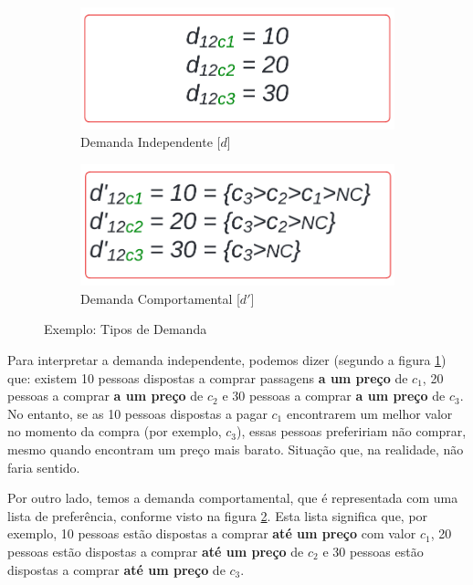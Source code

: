 \begin{figure}[h!]
	\centering
	\begin{subfigure}[b]{0.40\linewidth}
		\includegraphics[width=\linewidth]{img/dem_indepen.png}
		\caption{Demanda Independente [$d$]}
		\label{fig:dem_indepen}
	\end{subfigure}\hspace{5mm}
	\begin{subfigure}[b]{0.40\linewidth}
		\includegraphics[width=\linewidth]{img/dem_compo.png}
		\caption{Demanda Comportamental [$d'$]}
		\label{fig:dem_comporta}
	\end{subfigure}
	\caption{Exemplo: Tipos de Demanda}
	\label{fig: tipos_demanda}
\end{figure}


Para interpretar a demanda independente, podemos dizer (segundo a figura \ref{fig:dem_indepen}) que: existem 10 pessoas dispostas a comprar passagens \textbf{a um preço} de $c_1$, 20 pessoas a comprar \textbf{a um preço} de $c_2$ e 30 pessoas a comprar \textbf{a um preço} de $c_3$. No entanto, se as 10 pessoas dispostas a pagar $c_1$ encontrarem um melhor valor no momento da compra (por exemplo, $c_3$), essas pessoas prefeririam não comprar, mesmo quando encontram um preço mais barato. Situação que, na realidade, não faria sentido.

Por outro lado, temos a demanda comportamental, que é representada com uma lista de preferência, conforme visto na figura \ref{fig:dem_comporta}. Esta lista significa que, por exemplo, 10 pessoas estão dispostas a comprar \textbf{até um preço} com valor $c_1$, 20 pessoas estão dispostas a comprar \textbf{até um preço} de $c_2$ e 30 pessoas estão dispostas a comprar \textbf{até um preço} de $c_3$.

